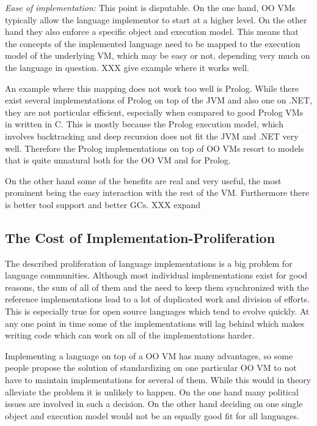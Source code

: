 \documentclass{llncs}
\begin{document}
\emph{Ease of implementation:} This point is disputable. On the one hand, OO
VMs typically allow the language implementor to start at a higher level. On the
other hand they also enforce a specific object and execution model. This means
that the concepts of the implemented language need to be mapped to the
execution model of the underlying VM, which may be easy or not, depending very
much on the language in question. XXX give example where it works well.

An example where this mapping does not work too well is Prolog. While there
exist several implementations of Prolog on top of the JVM and also one on .NET,
they are not particular efficient, especially when compared to good Prolog VMs
in written in C. This is mostly because the Prolog execution model, which
involves backtracking and deep recursion does not fit the JVM and .NET very
well. Therefore the Prolog implementations on top of OO VMs resort to models
that is quite unnatural both for the OO VM and for Prolog.


On the other hand some of the benefits are real and very useful, the most
prominent being the easy interaction with the rest of the VM. Furthermore there
is better tool support and better GCs. XXX expand


\subsection{The Cost of Implementation-Proliferation}

The described proliferation of language implementations is a big problem for
language communities. Although most individual implementations exist for good
reasons, the sum of all of them and the need to keep them synchronized with the
reference implementations lead to a lot of duplicated work and division of
efforts. This is especially true for open source languages which tend to evolve
quickly. At any one point in time some of the implementations will lag behind
which makes writing code which can work on all of the implementations harder.

Implementing a language on top of a OO VM has many advantages, so some
people propose the solution of standardizing on one particular OO VM to not have
to maintain implementations for several of them. While this would in theory
alleviate the problem it is unlikely to happen. On the one hand many political
issues are involved in such a decision. On the other hand deciding on one single
object and execution model would not be an equally good fit for all languages.
\end{document}
